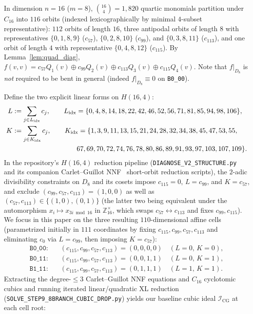 \documentclass[11pt,a4paper]{article}
\theoremstyle{definition}
\newcommand{\Z}{\mathbb{Z}}
\begin{document}
In dimension $n=16$ ($m=8$), $\binom{16}{4} = 1{,}820$ quartic monomials partition under $C_{16}$ into $116$ orbits (indexed lexicographically by minimal $4$-subset representative): $112$ orbits of length $16$, three antipodal orbits of length $8$ with representatives $\{0,1,8,9\}$ ($c_{57}$), $\{0,2,8,10\}$ ($c_{99}$), and $\{0,3,8,11\}$ ($c_{113}$), and one orbit of length $4$ with representative $\{0,4,8,12\}$ ($c_{115}$). By Lemma~\ref{lem:quad_diag}, $f(v,v) = c_{57} Q_1(v) \oplus c_{99} Q_2(v) \oplus c_{113} Q_3(v) \oplus c_{115} Q_4(v)$. Note that $f|_{D_8}$ is \emph{not} required to be bent in general (indeed $f|_{D_8} \equiv 0$ on \texttt{B0\_00}).

Define the two explicit linear forms on $H(16,4)$:
\begin{align*}
  L &:= \sum_{j \in L_{\mathrm{idx}}} c_j, \qquad L_{\mathrm{idx}} = \{0,4,8,14,18,22,42,46,52,56,71,81,85,94,98,106\}, \\
  K &:= \sum_{j \in K_{\mathrm{idx}}} c_j, \qquad K_{\mathrm{idx}} = \{1,3,9,11,13,15,21,24,28,32,34,38,45,47,53,55,\\
    &\hspace{9.4em} 67,69,70,72,74,76,78,80,86,89,91,93,97,103,107,109\}.
\end{align*}
In the repository's $H(16,4)$ reduction pipeline (\texttt{DIAGNOSE\_V2\_STRUCTURE.py} and its companion Carlet--Guillot NNF~\cite{carlet_guillot} short-orbit reduction scripts), the $2$-adic divisibility constraints on $D_8$ and its cosets impose $c_{115}=0$, $L = c_{99}$, and $K = c_{57}$, and exclude $(c_{99}, c_{57}, c_{113}) = (1,0,0)$ as well as $(c_{57}, c_{113}) \in \{(1,0),(0,1)\}$ (the latter two being equivalent under the automorphism $x_i \mapsto x_{3i \bmod 16}$ in $\Z_{16}^\times$, which swaps $c_{57} \leftrightarrow c_{113}$ and fixes $c_{99}, c_{115}$). We focus in this paper on the three resulting $110$-dimensional affine cells (parametrized initially in $111$ coordinates by fixing $c_{115}, c_{99}, c_{57}, c_{113}$ and eliminating $c_0$ via $L = c_{99}$, then imposing $K = c_{57}$):
\begin{align*}
  \texttt{B0\_00}: &\quad (c_{115}, c_{99}, c_{57}, c_{113}) = (0, 0, 0, 0) \quad (L=0,\, K=0), \\
  \texttt{B0\_11}: &\quad (c_{115}, c_{99}, c_{57}, c_{113}) = (0, 0, 1, 1) \quad (L=0,\, K=1), \\
  \texttt{B1\_11}: &\quad (c_{115}, c_{99}, c_{57}, c_{113}) = (0, 1, 1, 1) \quad (L=1,\, K=1).
\end{align*}
Extracting the degree-$\le 3$ Carlet--Guillot NNF equations and $C_{16}$ cyclotomic cubics and running iterated linear/quadratic XL reduction (\texttt{SOLVE\_STEP9\_8BRANCH\_CUBIC\_DROP.py}) yields our baseline cubic ideal $\mathcal{I}_{\mathrm{CG}}$ at each cell root:
\end{document}

